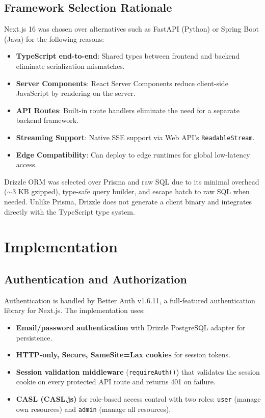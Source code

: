 \documentclass[conference]{IEEEtran}
\begin{document}
\subsection{Framework Selection Rationale}

Next.js 16 was chosen over alternatives such as FastAPI (Python) or Spring Boot (Java) for the following reasons:

\begin{itemize}
  \item \textbf{TypeScript end-to-end}: Shared types between frontend and backend eliminate serialization mismatches.
  \item \textbf{Server Components}: React Server Components reduce client-side JavaScript by rendering on the server.
  \item \textbf{API Routes}: Built-in route handlers eliminate the need for a separate backend framework.
  \item \textbf{Streaming Support}: Native SSE support via Web API's \texttt{ReadableStream}.
  \item \textbf{Edge Compatibility}: Can deploy to edge runtimes for global low-latency access.
\end{itemize}

Drizzle ORM was selected over Prisma and raw SQL due to its minimal overhead ($\sim$3 KB gzipped), type-safe query builder, and escape hatch to raw SQL when needed. Unlike Prisma, Drizzle does not generate a client binary and integrates directly with the TypeScript type system.

\section{Implementation}

\subsection{Authentication and Authorization}

Authentication is handled by Better Auth v1.6.11, a full-featured authentication library for Next.js. The implementation uses:

\begin{itemize}
  \item \textbf{Email/password authentication} with Drizzle PostgreSQL adapter for persistence.
  \item \textbf{HTTP-only, Secure, SameSite=Lax cookies} for session tokens.
  \item \textbf{Session validation middleware} (\texttt{requireAuth()}) that validates the session cookie on every protected API route and returns 401 on failure.
  \item \textbf{CASL (CASL.js)} for role-based access control with two roles: \texttt{user} (manage own resources) and \texttt{admin} (manage all resources).
\end{itemize}
\end{document}
